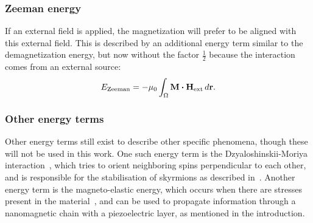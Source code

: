 \documentclass[11pt,a4paper,english]{article}
\begin{document}
\subsubsection{Zeeman energy}
If an external field is applied, the magnetization will prefer to be aligned with this external field. This is described by an additional energy term similar to the demagnetization energy, but now without the factor $\frac{1}{2}$ because the interaction comes from an external source:
\begin{equation}
    E_\mathrm{Zeeman} = -\mu_0 \int_\Omega \vb{M} \vdot \vb{H_\mathrm{ext}} \, d\vb{r} \mathrm{.} \label{eq:Energy_Term_Zeeman}
\end{equation}

\subsubsection{Other energy terms}
Other energy terms still exist to describe other specific phenomena, though these will not be used in this work. One such energy term is the Dzyaloshinskii-Moriya interaction~\cite{DzyaloshinskiiMoriya}, which tries to orient neighboring spins perpendicular to each other, and is responsible for the stabilisation of skyrmions as described in~\cite{skyrmions}. Another energy term is the magneto-elastic energy, which occurs when there are stresses present in the material~\cite{Gilbert1956}, and can be used to propagate information through a nanomagnetic chain with a piezoelectric layer, as mentioned in the introduction.
\end{document}
